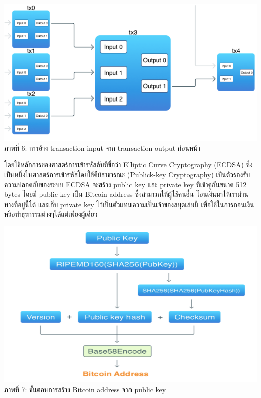 \documentclass[letterpaper, 10pt, conference]{ieeeconf}
\begin{document}
	{\centering 
		\includegraphics[scale=0.5]{system-detail-3} \\
		ภาพที่ 6: การอ้าง transaction input จาก transaction output ก่อนหน้า \par 
	}
	\bigskip
	
	\par โดยใช้หลักการของศาสตร์การเข้ารหัสลับที่ชื่อว่า Elliptic Curve Cryptography (ECDSA) ซึ่งเป็นหนึ่งในศาสตร์การเข้ารหัสโดยใช้คีย์สาธารณะ (Publick-key Cryptography) เป็นตัวรองรับความปลอดภัยของระบบ ECDSA จะสร้าง public key และ private key ที่เข้าคู่กันขนาด 512 bytes โดยมี public key เป็น Bitcoin address ซึ่งสามารถให้ผู้ใช้คนอื่น โอนเงินมาให้เราผ่านทางที่อยู่นี้ได้ และเก็บ private key ไว้เป็นตัวแทนความเป็นเจ้าของสมุดเล่มนี้ เพื่อใช้ในการถอนเงินหรือทำธุรกรรมต่างๆได้แต่เพียงผู้เดียว

	{\centering 
		\includegraphics[scale=0.65]{system-detail-4} \\
		ภาพที่ 7: ขั้นตอนการสร้าง Bitcoin address จาก public key\par 
	}
	\bigskip
\end{document}
